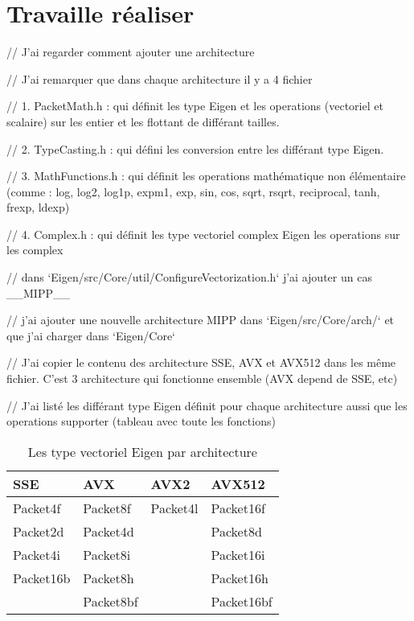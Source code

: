 \section{Travaille réaliser}

// J'ai regarder comment ajouter une architecture

// J'ai remarquer que dans chaque architecture il y a 4 fichier

// 1. PacketMath.h : qui définit les type Eigen et les operations (vectoriel et scalaire)
sur les entier et les flottant de différant tailles.

// 2. TypeCasting.h : qui défini les conversion entre les différant type Eigen.

// 3. MathFunctions.h : qui définit les operations mathématique non élémentaire (comme :
log, log2, log1p, expm1, exp, sin, cos, sqrt, rsqrt, reciprocal, tanh, frexp, ldexp)

// 4. Complex.h : qui définit les type vectoriel complex Eigen les operations sur les complex

// dans `Eigen/src/Core/util/ConfigureVectorization.h` j'ai ajouter un cas \_\_MIPP\_\_

// j'ai ajouter une nouvelle architecture MIPP dans `Eigen/src/Core/arch/` et que j'ai
charger dans `Eigen/Core`

// J'ai copier le contenu des architecture SSE, AVX et AVX512 dans les même fichier.
C'est 3 architecture qui fonctionne ensemble (AVX depend de SSE, etc)

// J'ai listé les différant type Eigen définit pour chaque architecture aussi que les
operations supporter (tableau avec toute les fonctions)

\begin{table}[H]
  \centering
  \begin{tabular}[H]{|l|l|l|l|}
    \hline
    \textbf{SSE} & \textbf{AVX} & \textbf{AVX2} & \textbf{AVX512} \\
    \hline
    Packet4f     & Packet8f     & Packet4l      & Packet16f       \\
    \hline
    Packet2d     & Packet4d     &               & Packet8d        \\
    \hline
    Packet4i     & Packet8i     &               & Packet16i       \\
    \hline
    Packet16b    & Packet8h     &               & Packet16h       \\
    \hline
                 & Packet8bf    &               & Packet16bf      \\
    \hline
  \end{tabular}
  \caption{Les type vectoriel Eigen par architecture}
\end{table}

